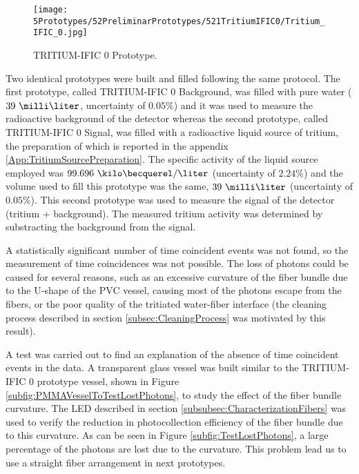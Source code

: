 \begin{figure}[h]
\centering
\texttt{[image: 5Prototypes/52PreliminarPrototypes/521TritiumIFIC0/Tritium\_IFIC\_0.jpg]}
\caption{TRITIUM-IFIC 0 Prototype.\label{fig:TritiumIFIC0}}
\end{figure}

Two identical prototypes were built and filled following the same protocol. The first prototype, called TRITIUM-IFIC 0 Background, was filled with pure water ($39~\milli\liter$, uncertainty of $0.05\%$) and it was used to measure the radioactive background of the detector whereas the second prototype, called TRITIUM-IFIC 0 Signal, was filled with a radioactive liquid source of tritium, the preparation of which is reported in the appendix \ref{App:TritiumSourcePreparation}. The specific activity of the liquid source employed was $99.696~\kilo\becquerel/\liter$ (uncertainty of $2.24\%$) and the volume used to fill this prototype was the same, $39~\milli\liter$ (uncertainty of $0.05\%$). This second prototype was used to measure the signal of the detector (tritium + background). The measured tritium activity was determined by substracting the background from the signal. 

A statistically significant number of time coincident events was not found, so the measurement of time coincidences was not possible. The loss of photons could be caused for several reasons, such as an excessive curvature of the fiber bundle due to the U-shape of the PVC vessel, causing most of the photons escape from the fibers, or the poor quality of the tritiated water-fiber interface (the cleaning process described in section \ref{subsec:CleaningProcess} was motivated by this result). 

A test was carried out to find an explanation of the absence of time coincident events in the data. A transparent glass vessel was built similar to the TRITIUM-IFIC 0 prototype vessel, shown in Figure \ref{subfig:PMMAVesselToTestLostPhotons}, to study the effect of the fiber bundle curvature. The LED described in section \ref{subsubsec:CharacterizationFibers} was used to verify the reduction in photocollection efficiency of the fiber bundle due to this curvature. As can be seen in Figure \ref{subfig:TestLostPhotons}, a large percentage of the photons are lost due to the curvature. This problem lead us to use a straight fiber arrangement in next prototypes.

